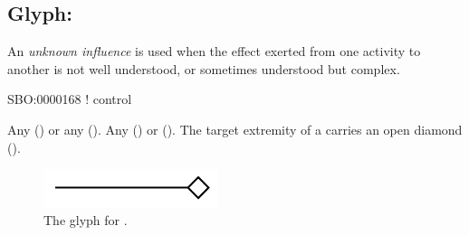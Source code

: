 \subsection{Glyph: }
\label{sec:af:unknown_infl}

An \emph{unknown influence} is used when the effect exerted from one activity to another is not well understood, or sometimes understood but complex.

\begin{glyphDescription}

\glyphSboTerm SBO:0000168 ! control

 \glyphOrigin Any  () or any  ().
 \glyphTarget Any  () or  ().
 \glyphEndPoint The target extremity of a  carries an open diamond ().

\end{glyphDescription}

\begin{figure}[H]
  \centering
  \includegraphics[width = 2in]{images/unknownInfluence}
  \caption{The \AF glyph for .}
  \label{fig:af:unknownInfl}
\end{figure}

